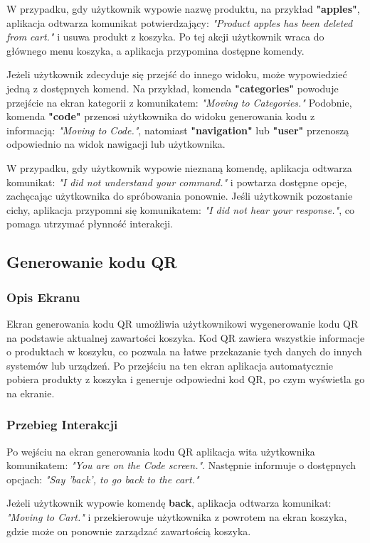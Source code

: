 W przypadku, gdy użytkownik wypowie nazwę produktu, na przykład \textbf{"apples"}, aplikacja odtwarza komunikat potwierdzający: \textit{"Product apples has been deleted from cart."} i usuwa produkt z koszyka. Po tej akcji użytkownik wraca do głównego menu koszyka, a aplikacja przypomina dostępne komendy.

Jeżeli użytkownik zdecyduje się przejść do innego widoku, może wypowiedzieć jedną z dostępnych komend. Na przykład, komenda \textbf{"categories"} powoduje przejście na ekran kategorii z komunikatem: \textit{"Moving to Categories."} Podobnie, komenda \textbf{"code"} przenosi użytkownika do widoku generowania kodu z informacją: \textit{"Moving to Code."}, natomiast \textbf{"navigation"} lub \textbf{"user"} przenoszą odpowiednio na widok nawigacji lub użytkownika.

W przypadku, gdy użytkownik wypowie nieznaną komendę, aplikacja odtwarza komunikat: \textit{"I did not understand your command."} i powtarza dostępne opcje, zachęcając użytkownika do spróbowania ponownie. Jeśli użytkownik pozostanie cichy, aplikacja przypomni się komunikatem: \textit{"I did not hear your response."}, co pomaga utrzymać płynność interakcji.

\subsection{Generowanie kodu QR}

\subsubsection{Opis Ekranu}
Ekran generowania kodu QR umożliwia użytkownikowi wygenerowanie kodu QR na podstawie aktualnej zawartości koszyka. Kod QR zawiera wszystkie informacje o produktach w koszyku, co pozwala na łatwe przekazanie tych danych do innych systemów lub urządzeń. Po przejściu na ten ekran aplikacja automatycznie pobiera produkty z koszyka i generuje odpowiedni kod QR, po czym wyświetla go na ekranie.

\subsubsection{Przebieg Interakcji}
Po wejściu na ekran generowania kodu QR aplikacja wita użytkownika komunikatem: \textit{"You are on the Code screen."}. Następnie informuje o dostępnych opcjach: \textit{"Say 'back', to go back to the cart."}

Jeżeli użytkownik wypowie komendę \textbf{back}, aplikacja odtwarza komunikat: \textit{"Moving to Cart."} i przekierowuje użytkownika z powrotem na ekran koszyka, gdzie może on ponownie zarządzać zawartością koszyka.

